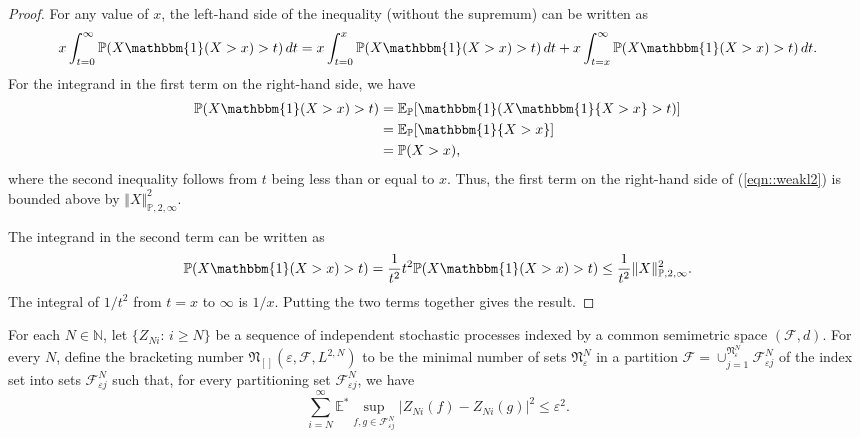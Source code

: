\documentclass[11pt,a4paper]{article}
\newcommand{\E}{\mathbb{E}}
\renewcommand{\Pr}{\mathbb{P}}
\begin{document}
\begin{appendices}
\begin{proof}
    For any value of $x$, the left-hand side of the inequality (without the supremum) can be written as
    \begin{equation} \label{eqn::weakl2}
        x\int_{t=0}^{\infty} \Pr(X\mathbbm{1}(X > x) > t)\,dt = x\int_{t=0}^{x} \Pr(X\mathbbm{1}(X > x) > t)\,dt + x\int_{t=x}^{\infty} \Pr(X\mathbbm{1}(X > x) > t)\,dt.
    \end{equation}
    For the integrand in the first term on the right-hand side, we have
    \begin{align*}
        \Pr(X\mathbbm{1}(X > x) > t) &= \E_{\Pr}[\mathbbm{1}(X\mathbbm{1}\{X > x\} > t)]\\
        &= \E_{\Pr}[\mathbbm{1}\{X > x\}] \\
        &= \Pr(X > x),
    \end{align*}
    where the second inequality follows from $t$ being less than or equal to $x$. Thus, the first term on the right-hand side of (\ref{eqn::weakl2}) is bounded above by $\Vert X \Vert_{\Pr,2,\infty}^{2}$.
    
    The integrand in the second term can be written as
    \begin{equation*}
        \Pr(X\mathbbm{1}(X > x) > t) = \frac{1}{t^{2}}t^{2}\Pr(X\mathbbm{1}(X > x) > t) \leq \frac{1}{t^{2}}\Vert X \Vert_{\Pr,2,\infty}^{2}.
    \end{equation*}
    The integral of $1/t^{2}$ from $t=x$ to $\infty$ is $1/x$. Putting the two terms together gives the result.
\end{proof}

For each $N \in \mathbb{N}$, let $\{Z_{Ni}:\,i \geq N\}$ be a sequence of independent stochastic processes indexed by a common semimetric space $(\mathcal{F}, d)$. For every $N$, define the bracketing number $\mathfrak{N}_{[]}(\varepsilon, \mathcal{F},L^{2,N})$ to be the minimal number of sets $\mathfrak{N}_{\varepsilon}^{N}$ in a partition $\mathcal{F} = \cup_{j=1}^{\mathfrak{N}_{\varepsilon}^{N}} \mathcal{F}_{\varepsilon j}^{N}$ of the index set into sets $\mathcal{F}_{\varepsilon j}^{N}$ such that, for every partitioning set $\mathcal{F}_{\varepsilon j}^{N}$, we have
\begin{equation*}
    \sum_{i=N}^{\infty} \E^{*} \sup_{f,g \in \mathcal{F}_{\varepsilon j}^{N}} |Z_{Ni}(f) - Z_{Ni}(g)|^{2} \leq \varepsilon^{2}.
\end{equation*}


\end{appendices}
\end{document}

